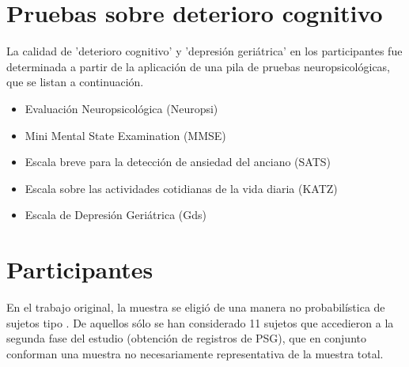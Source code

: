 \documentclass[12pt,a4paper]{mitthesis}
\begin{document}
\section{Pruebas sobre deterioro cognitivo}

La calidad de 'deterioro cognitivo' y 'depresi\'on geri\'atrica' en los participantes fue
determinada a partir de la aplicaci\'on de una pila de pruebas neuropsicol\'ogicas, que se listan a 
continuaci\'on.

\begin{itemize}
\item {Evaluaci\'on Neuropsicol\'ogica (Neuropsi)} \cite{Solis03}
\item {Mini Mental State Examination (MMSE)} \cite{Velasco15}
\item {Escala breve para la detecci\'on de ansiedad del anciano (SATS)} \cite{Vargas11}
\item {Escala sobre las actividades cotidianas de la vida diaria (KATZ)} \cite{Roumec14}
\item {Escala de Depresi\'on Geri\'atrica (Gds)} \cite{Greenberg12,Cuijpers13}
\end{itemize}


\section{Participantes}

En el trabajo original, la muestra se eligi\'o de una manera no probabilística de sujetos tipo 
\cite{Garcia09}. De aquellos s\'olo se han considerado 11 sujetos que accedieron a la segunda fase 
del estudio (obtenci\'on de registros de PSG), que en conjunto conforman una muestra no 
necesariamente representativa de la muestra total.
\end{document}
